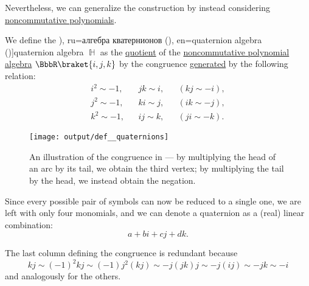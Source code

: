 Nevertheless, we can generalize the construction by instead considering \hyperref[def:noncommutative_polynomial_algebra]{noncommutative polynomials}.

\begin{definition}\label{def:quaternion_algebra}\mimprovised
  We define the \term[bg=кватерниони (\cite[454]{Обрешков1962ВисшаАлгебра}), ru=алгебра кватернионов (\cite[41]{Винберг2014Алгебра}), en=quaternion algebra (\cite[exerc. III.1.12]{Aluffi2009Algebra})]{quaternion algebra} \( \BbbH \) as the \hyperref[def:algebra_over_ring/quotient]{quotient} of the \hyperref[def:noncommutative_polynomial_algebra]{noncommutative polynomial algebra} \( \BbbR\braket{ i, j, k } \) by the congruence \hyperref[def:first_order_generated_congruence]{generated} by the following relation:
  \begin{align*}
    i^2 \sim -1, && jk \sim i, && (kj \sim -i), \\
    j^2 \sim -1, && ki \sim j, && (ik \sim -j), \\
    k^2 \sim -1, && ij \sim k, && (ji \sim -k).
  \end{align*}

  \begin{figure}[!ht]
    \centering
    \texttt{[image: output/def\_\_quaternions]}
    \caption{An illustration of the congruence in  --- by multiplying the head of an arc by its tail, we obtain the third vertex; by multiplying the tail by the head, we instead obtain the negation.}\label{fig:def:quaternion_algebra}
  \end{figure}

  Since every possible pair of symbols can now be reduced to a single one, we are left with only four monomials, and we can denote a quaternion as a (real) linear combination:
  \begin{equation*}
    a + bi + cj + dk.
  \end{equation*}
\end{definition}
\begin{comments}
  \item The last column defining the congruence is redundant because
  \begin{equation*}
    kj \sim (-1)^2 kj \sim (-1) j^2 (kj) \sim -j (jk) j \sim -j (ij) \sim -jk \sim -i
  \end{equation*}
  and analogously for the others.
\end{comments}

